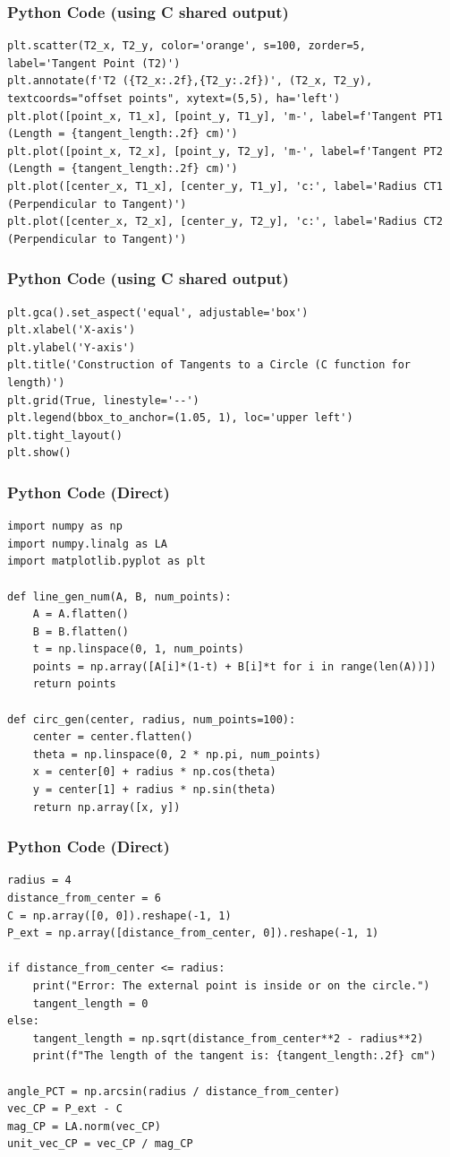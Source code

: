 \documentclass{beamer}
\begin{document}
\begin{frame}[fragile]
\frametitle{Python Code (using C shared output)}
\begin{lstlisting}
plt.scatter(T2_x, T2_y, color='orange', s=100, zorder=5, label='Tangent Point (T2)')
plt.annotate(f'T2 ({T2_x:.2f},{T2_y:.2f})', (T2_x, T2_y), textcoords="offset points", xytext=(5,5), ha='left')
plt.plot([point_x, T1_x], [point_y, T1_y], 'm-', label=f'Tangent PT1 (Length = {tangent_length:.2f} cm)')
plt.plot([point_x, T2_x], [point_y, T2_y], 'm-', label=f'Tangent PT2 (Length = {tangent_length:.2f} cm)')
plt.plot([center_x, T1_x], [center_y, T1_y], 'c:', label='Radius CT1 (Perpendicular to Tangent)')
plt.plot([center_x, T2_x], [center_y, T2_y], 'c:', label='Radius CT2 (Perpendicular to Tangent)')
\end{lstlisting}
\end{frame}

\begin{frame}[fragile]
\frametitle{Python Code (using C shared output)}
\begin{lstlisting}
plt.gca().set_aspect('equal', adjustable='box')
plt.xlabel('X-axis')
plt.ylabel('Y-axis')
plt.title('Construction of Tangents to a Circle (C function for length)')
plt.grid(True, linestyle='--')
plt.legend(bbox_to_anchor=(1.05, 1), loc='upper left')
plt.tight_layout()
plt.show()
\end{lstlisting}
\end{frame}

\begin{frame}[fragile]
\frametitle{Python Code (Direct)}
\begin{lstlisting}
import numpy as np
import numpy.linalg as LA
import matplotlib.pyplot as plt

def line_gen_num(A, B, num_points):
    A = A.flatten()
    B = B.flatten()
    t = np.linspace(0, 1, num_points)
    points = np.array([A[i]*(1-t) + B[i]*t for i in range(len(A))])
    return points

def circ_gen(center, radius, num_points=100):
    center = center.flatten()
    theta = np.linspace(0, 2 * np.pi, num_points)
    x = center[0] + radius * np.cos(theta)
    y = center[1] + radius * np.sin(theta)
    return np.array([x, y])
\end{lstlisting}
\end{frame}

\begin{frame}[fragile]
\frametitle{Python Code (Direct)}
\begin{lstlisting}
radius = 4
distance_from_center = 6
C = np.array([0, 0]).reshape(-1, 1)
P_ext = np.array([distance_from_center, 0]).reshape(-1, 1)

if distance_from_center <= radius:
    print("Error: The external point is inside or on the circle.")
    tangent_length = 0
else:
    tangent_length = np.sqrt(distance_from_center**2 - radius**2)
    print(f"The length of the tangent is: {tangent_length:.2f} cm")

angle_PCT = np.arcsin(radius / distance_from_center)
vec_CP = P_ext - C
mag_CP = LA.norm(vec_CP)
unit_vec_CP = vec_CP / mag_CP
\end{lstlisting}
\end{frame}
\end{document}
